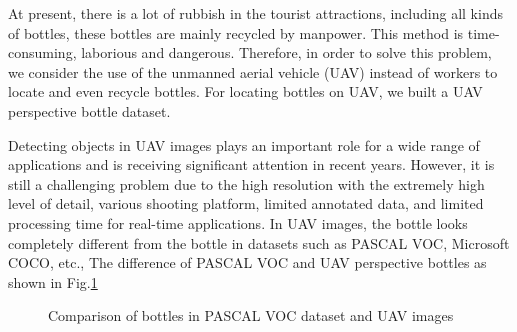 \label{sec:intro}


At present, there is a lot of rubbish in the tourist attractions, including all kinds of bottles, these bottles are mainly recycled by manpower. This method is time-consuming, laborious and dangerous. Therefore, in order to solve this problem, we consider the use of the unmanned aerial vehicle (UAV) instead of workers to locate and even recycle bottles. For locating bottles on UAV, we built a UAV perspective bottle dataset. 



Detecting objects in UAV images plays an important role for a wide range of applications and is receiving significant attention in recent years\cite{UAV2}. However, it is still a challenging problem due to the high resolution with the extremely high level of detail, various shooting platform, limited annotated data, and limited processing time for real-time applications\cite{car_detection}. In UAV images, the bottle looks completely different from the bottle in datasets such as PASCAL VOC\cite{PASCALVOC}, Microsoft COCO\cite{COCO}, etc., The difference of PASCAL VOC and UAV perspective bottles as shown in Fig.\ref{bottle_VOC_UAV} 

\begin{figure}
	\centering
	
	\caption{Comparison of bottles in PASCAL VOC dataset and UAV images}
	\label{bottle_VOC_UAV}
\end{figure}


